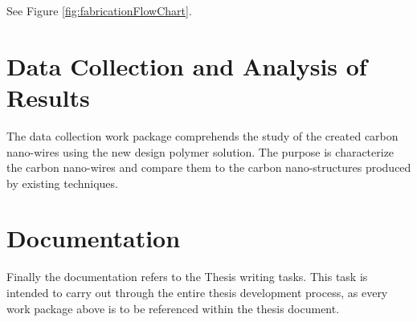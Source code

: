 See Figure \ref{fig:fabricationFlowChart}.
	
\section{Data Collection and Analysis of Results}
The data collection work package comprehends the study of the created carbon nano-wires using the new design polymer solution. The purpose is characterize the carbon nano-wires and compare them to the carbon nano-structures produced by existing techniques.

\section{Documentation}
Finally the documentation refers to the Thesis writing tasks. This task is intended to carry out through the entire thesis development process, as every work package above is to be referenced within the thesis document.



